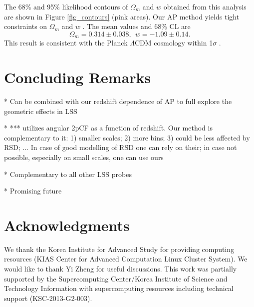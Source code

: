 \documentclass[iop]{emulateapj}
\begin{document}
The 68\% and 95\% likelihood contours of $\Omega_m$ and $w$ 
obtained from this analysis are shown in Figure \ref{fig_contours} (pink areas).
Our AP method yields tight constraints on $\Omega_m$ and $w$ .
The mean values and 68\% CL are
\begin{equation}
 \Omega_m=0.314 \pm 0.038,\ \ w = -1.09 \pm 0.14.
\end{equation}
This result is consistent with the Planck $\Lambda$CDM cosmology within 1$\sigma$ \citep{Planck2015}.







\section{Concluding Remarks}

 * Can be combined with our redshift dependence of AP to full explore the geometric effects in LSS

 * *** utilizes angular 2pCF as a function of redshift. Our method is complementary to it: 1) smaller scales; 2) more bins; 3) could be less affected by RSD; ... In case of good modelling of RSD one can rely on their; in case not possible, especially on small scales, one can use ours

 * Complementary to all other LSS probes

 * Promising future



\section*{Acknowledgments}

We thank the Korea Institute for Advanced Study for providing computing resources (KIAS Center for Advanced Computation Linux Cluster System).
We would like to thank Yi Zheng for useful discussions.
This work was partially supported by the
Supercomputing Center/Korea Institute of Science and
Technology Information with supercomputing resources
including technical support (KSC-2013-G2-003).


\appendix
\end{document}
